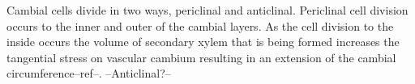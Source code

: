 Cambial cells divide in two ways, periclinal and anticlinal. Periclinal cell
division occurs to the inner and outer of the cambial layers. As the cell
division to the inside occurs the volume of secondary xylem that is being formed
increases the tangential stress on vascular cambium resulting in an extension of
the cambial circumference--ref--. --Anticlinal?--
